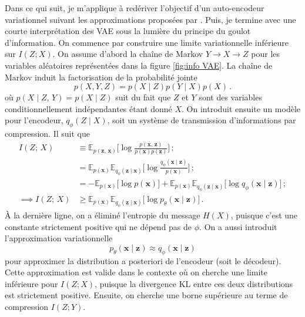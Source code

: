 Dans ce qui suit, je m'applique à redériver l'objectif d'un auto-encodeur variationnel suivant les approximations 
proposées par \citet{Alemi2017}. Puis, je termine avec une courte interprétation des VAE sous la lumière du principe du goulot d'information.
On commence par construire une limite variationnelle inférieure sur $I(Z; X)$. 
On assume d'abord la chaîne de Markov $Y \rightarrow X \rightarrow Z$ pour les variables 
aléatoires représentées dans la figure \ref{fig:info VAE}. La chaîne de Markov 
induit la factorisation de la probabilité jointe
\begin{equation}\label{eq:factorisation}
       p(X, Y, Z) = p(X \mid Z) p(Y \mid X) p(X)\, . 
\end{equation} 
où $p(X \mid Z,\, Y) = p(X \mid Z)$ suit du fait que $Z$ et $Y$ sont des variables conditionnellement indépendantes étant donné $X$.
On introduit ensuite un modèle pour l'encodeur,
$q_\phi (Z \mid X)$, soit un système de transmission d'informations par compression. Il 
suit que 
\begin{align}
        I(Z;\, X) &\equiv \mathbb{E}_{p(\mathbf{z},\, \mathbf{x})} \bigg[\log \frac{p(\mathbf{x},\, \mathbf{z})}{p(\mathbf{x}) p(\mathbf{z})} \bigg]\, ;  \\[1.5ex]
        &= \mathbb{E}_{p(\mathbf{x})}\mathbb{E}_{q_\phi(\mathbf{z} \mid \mathbf{x})} \bigg[\log \frac{q_\phi(\mathbf{x} \mid \mathbf{z})}{p(\mathbf{x})} \bigg]\, ;  \\[1.5ex]
                &= -\mathbb{E}_{p(\mathbf{x})}\bigg[\log p(\mathbf{x}) \bigg]  
                + \mathbb{E}_{p(\mathbf{x})}\mathbb{E}_{q_\phi(\mathbf{z} \mid \mathbf{x})} \bigg[\log q_\phi(\mathbf{x} \mid \mathbf{z})\bigg]\, ;  \\[1.5ex]
                \label{eq:maximum info}
                \implies I(Z;\, X)&\geq \mathbb{E}_{p(\mathbf{x})}\mathbb{E}_{q_\phi(\mathbf{z} \mid \mathbf{x})} \bigg[\log p_\theta (\mathbf{x} \mid \mathbf{z})\bigg]\, .
\end{align}
À la dernière ligne, on a éliminé l'entropie du message $H(X)$, puisque c'est une constante strictement positive qui ne dépend pas de $\phi$.
On a aussi introduit l'approximation variationnelle $$p_\theta (\mathbf{x} \mid \mathbf{z}) \approx q_\phi (\mathbf{x} \mid \mathbf{z})$$ 
pour approximer la distribution a posteriori de l'encodeur (soit le décodeur). Cette approximation est valide dans le contexte où 
on cherche une limite inférieure pour $I(Z; X)$, puisque la divergence KL entre ces deux distributions est strictement positive.
Ensuite, on cherche une borne supérieure au terme de compression $I(Z; Y)$. 
